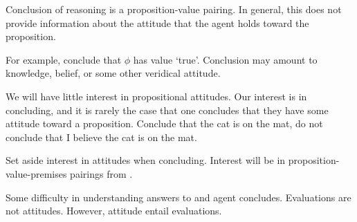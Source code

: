 \begin{note}
  Conclusion of reasoning is a proposition-value pairing.
  In general, this does not provide information about the attitude that the agent holds toward the proposition.

  For example, conclude that \(\phi\) has value `true'.
  Conclusion may amount to knowledge, belief, or some other veridical attitude.

  We will have little interest in propositional attitudes.
  Our interest is in concluding, and it is rarely the case that one concludes that they have some attitude toward a proposition.
  Conclude that the cat is on the mat, do not conclude that I believe the cat is on the mat.

  Set aside interest in attitudes when concluding.
  Interest will be in proposition-value-premises pairings from \agpe{}.
\end{note}

\begin{note}
  Some difficulty in understanding answers to \qWhy{} and agent concludes.
  Evaluations are not attitudes.
  However, attitude entail evaluations.
\end{note}

